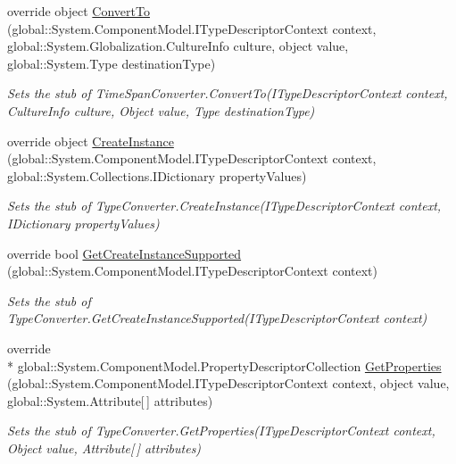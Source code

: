 \begin{DoxyCompactItemize}
override object \hyperlink{class_system_1_1_component_model_1_1_fakes_1_1_stub_time_span_converter_a9a716c40fbfea3b6f0cf476bc9c0fc88}{Convert\-To} (global\-::\-System.\-Component\-Model.\-I\-Type\-Descriptor\-Context context, global\-::\-System.\-Globalization.\-Culture\-Info culture, object value, global\-::\-System.\-Type destination\-Type)
\begin{DoxyCompactList}\small\item\em Sets the stub of Time\-Span\-Converter.\-Convert\-To(\-I\-Type\-Descriptor\-Context context, Culture\-Info culture, Object value, Type destination\-Type)\end{DoxyCompactList}\item 
override object \hyperlink{class_system_1_1_component_model_1_1_fakes_1_1_stub_time_span_converter_ab94245cbc6bdc9244debedf7ff37cdb9}{Create\-Instance} (global\-::\-System.\-Component\-Model.\-I\-Type\-Descriptor\-Context context, global\-::\-System.\-Collections.\-I\-Dictionary property\-Values)
\begin{DoxyCompactList}\small\item\em Sets the stub of Type\-Converter.\-Create\-Instance(\-I\-Type\-Descriptor\-Context context, I\-Dictionary property\-Values)\end{DoxyCompactList}\item 
override bool \hyperlink{class_system_1_1_component_model_1_1_fakes_1_1_stub_time_span_converter_af29a08a7b94af7fc0721db2312bf6572}{Get\-Create\-Instance\-Supported} (global\-::\-System.\-Component\-Model.\-I\-Type\-Descriptor\-Context context)
\begin{DoxyCompactList}\small\item\em Sets the stub of Type\-Converter.\-Get\-Create\-Instance\-Supported(\-I\-Type\-Descriptor\-Context context)\end{DoxyCompactList}\item 
override \\*
global\-::\-System.\-Component\-Model.\-Property\-Descriptor\-Collection \hyperlink{class_system_1_1_component_model_1_1_fakes_1_1_stub_time_span_converter_a73a4abd88626f0f019146b085837166f}{Get\-Properties} (global\-::\-System.\-Component\-Model.\-I\-Type\-Descriptor\-Context context, object value, global\-::\-System.\-Attribute\mbox{[}$\,$\mbox{]} attributes)
\begin{DoxyCompactList}\small\item\em Sets the stub of Type\-Converter.\-Get\-Properties(\-I\-Type\-Descriptor\-Context context, Object value, Attribute\mbox{[}$\,$\mbox{]} attributes)\end{DoxyCompactList}\item 

\end{DoxyCompactItemize}
